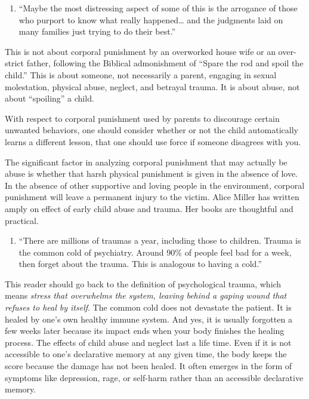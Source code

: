 \documentclass[]{book}
\providecommand{\tightlist}{%
  \setlength{\itemsep}{0pt}\setlength{\parskip}{0pt}}
\begin{document}
\begin{enumerate}
\def\labelenumi{\arabic{enumi}.}
\setcounter{enumi}{4}
\tightlist
\item
  ``Maybe the most distressing aspect of some of this is the arrogance of those who purport to know what really happened\ldots{} and the judgments laid on many families just trying to do their best.''
\end{enumerate}

This is not about corporal punishment by an overworked house wife or an over-strict father, following the Biblical admonishment of ``Spare the rod and spoil the child.'' This is about someone, not necessarily a parent, engaging in sexual molestation, physical abuse, neglect, and betrayal trauma. It is about abuse, not about ``spoiling'' a child.

With respect to corporal punishment used by parents to discourage certain unwanted behaviors, one should consider whether or not the child automatically learns a different lesson, that one should use force if someone disagrees with you.

The significant factor in analyzing corporal punishment that may actually be abuse is whether that harsh physical punishment is given in the absence of love. In the absence of other supportive and loving people in the environment, corporal punishment will leave a permanent injury to the victim. Alice Miller has written amply on effect of early child abuse and trauma. Her books are thoughtful and practical.

\begin{enumerate}
\def\labelenumi{\arabic{enumi}.}
\setcounter{enumi}{5}
\tightlist
\item
  ``There are millions of traumas a year, including those to children. Trauma is the common cold of psychiatry. Around 90\% of people feel bad for a week, then forget about the trauma. This is analogous to having a cold.''
\end{enumerate}

This reader should go back to the definition of psychological trauma, which means \emph{stress that overwhelms the system, leaving behind a gaping wound that refuses to heal by itself}. The common cold does not devastate the patient. It is healed by one's own healthy immune system. And yes, it is usually forgotten a few weeks later because its impact ends when your body finishes the healing process. The effects of child abuse and neglect last a life time. Even if it is not accessible to one's declarative memory at any given time, the body keeps the score because the damage has not been healed. It often emerges in the form of symptoms like depression, rage, or self-harm rather than an accessible declarative memory.
\end{document}
